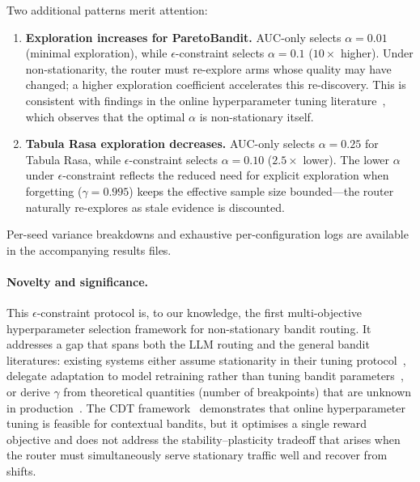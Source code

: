 Two additional patterns merit attention:

\begin{enumerate}[nosep,leftmargin=*]
  \item \textbf{Exploration increases for ParetoBandit.}
    AUC-only selects $\alpha{=}0.01$ (minimal exploration),
    while $\epsilon$-constraint selects $\alpha{=}0.1$
    ($10\times$ higher).
    Under non-stationarity, the router must re-explore arms whose
    quality may have changed; a higher exploration coefficient
    accelerates this re-discovery.
    This is consistent with findings in the online hyperparameter
    tuning literature~\cite{kang2024cdt}, which observes that the
    optimal $\alpha$ is non-stationary itself.

  \item \textbf{Tabula Rasa exploration decreases.}
    AUC-only selects $\alpha{=}0.25$ for Tabula Rasa, while
    $\epsilon$-constraint selects $\alpha{=}0.10$ ($2.5\times$ lower).
    The lower $\alpha$ under $\epsilon$-constraint reflects
    the reduced need for explicit exploration when forgetting
    ($\gamma{=}0.995$) keeps the effective sample size
    bounded---the router naturally re-explores as stale evidence
    is discounted.
\end{enumerate}
%
\noindent
Per-seed variance breakdowns and exhaustive per-configuration logs
are available in the accompanying results files.

\paragraph{Novelty and significance.}
This $\epsilon$-constraint protocol is, to our knowledge, the first
multi-objective hyperparameter selection framework for non-stationary
bandit routing.
It addresses a gap that spans both the LLM routing and the general
bandit literatures:
existing systems either assume stationarity in their tuning
protocol~\cite{panda2025pilot,wang2025barp,li2025llmbandit},
delegate adaptation to model retraining rather than tuning bandit
parameters~\cite{wang2025mixllm}, or derive $\gamma$ from
theoretical quantities (number of breakpoints) that are unknown in
production~\cite{garivier2011switching}.
The CDT framework~\cite{kang2024cdt} demonstrates that online
hyperparameter tuning is feasible for contextual bandits, but it
optimises a single reward objective and does not address the
stability--plasticity tradeoff that arises when the router must
simultaneously serve stationary traffic well and recover from shifts.

